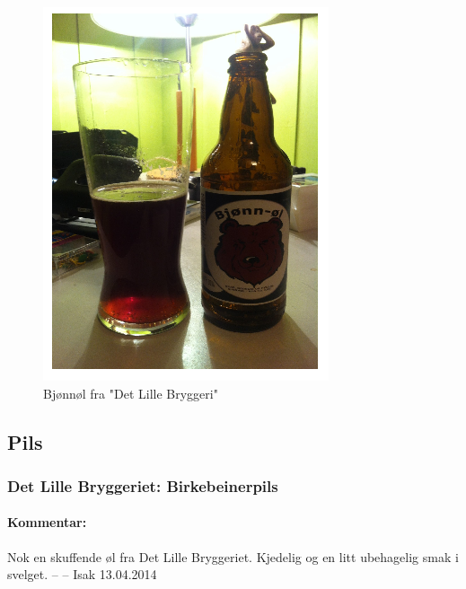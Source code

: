 \documentclass[12pt,a4paper,oneside,norsk]{article}
\begin{document}
\begin{figure} [H]
\centering
\includegraphics[scale=1.00]{Bilder/Ol/bjonnol.png} %
\caption{Bjønnøl fra "Det Lille Bryggeri"}
\end{figure}


\newpage
\subsection{Pils}

\subsubsection{Det Lille Bryggeriet: Birkebeinerpils}
\paragraph{Kommentar:}Nok en skuffende øl fra Det Lille Bryggeriet. Kjedelig og en litt ubehagelig smak i svelget. 
\newline
-- -- Isak 13.04.2014
\end{document}
